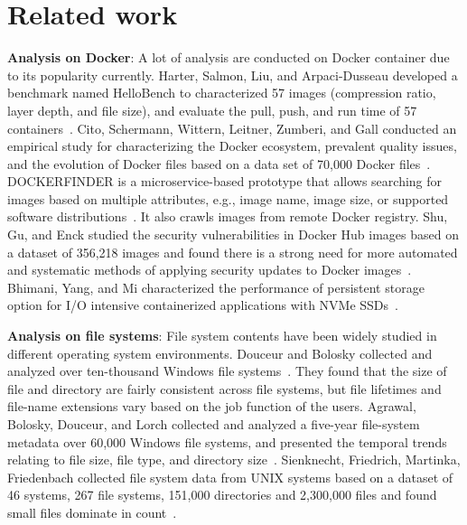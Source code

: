 \section{Related work}
\label{sec:related}

\textbf{Analysis on Docker}:
A lot of analysis are conducted on Docker container due to its popularity currently. 
Harter, Salmon, Liu, and Arpaci-Dusseau developed a benchmark named HelloBench to characterized 57 images (compression ratio, layer depth, and file size), and evaluate the pull, push, and run time of 57 containers~\cite{slacker}.
Cito, Schermann, Wittern, Leitner, Zumberi, and Gall conducted an empirical study for characterizing the Docker ecosystem, prevalent quality issues, and the evolution of Docker files based on a data set of 70,000 Docker files~\cite{dockervulnerabile}.
DOCKERFINDER is a microservice-based prototype that allows searching for images based on multiple attributes, e.g., image name, image size, or supported software distributions~\cite{dockerfinder}. It also crawls images from remote Docker registry.
Shu, Gu, and Enck studied the security vulnerabilities in Docker Hub images based on a dataset of 356,218 images and found there is a strong need for more automated and systematic methods of applying security updates to Docker images~\cite{analysisdockergithub}.
Bhimani, Yang, and Mi characterized the performance of persistent storage option for I/O intensive containerized applications with NVMe SSDs~\cite{dockerssd}.

\textbf{Analysis on file systems}:
File system contents have been widely studied in different operating system environments.
Douceur and Bolosky collected and analyzed over ten-thousand Windows file systems~\cite{largefscontent}. They found that the size of file and directory are fairly consistent across file systems, but file lifetimes and file-name extensions vary based on the job function of the users. 
Agrawal, Bolosky, Douceur, and Lorch collected and analyzed a five-year file-system metadata over 60,000 Windows file systems, and presented the temporal trends relating to file size, file type, and directory size~\cite{fiveyearfsmetadata}.
Sienknecht, Friedrich, Martinka, Friedenbach collected file system data from UNIX systems based on a dataset of 46 systems, 267 file systems, 151,000 directories and 2,300,000 files and found small files dominate in count~\cite{distributedatainfs}.


